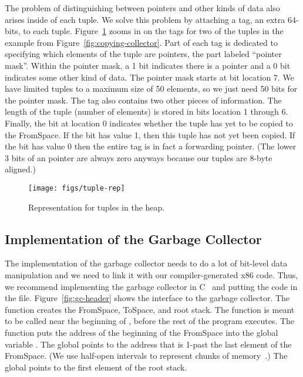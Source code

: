 \documentclass[11pt]{book}
\begin{document}
The problem of distinguishing between pointers and other kinds of data
also arises inside of each tuple. We solve this problem by attaching a
tag, an extra 64-bits, to each tuple. Figure~\ref{fig:tuple-rep} zooms
in on the tags for two of the tuples in the example from
Figure~\ref{fig:copying-collector}. Part of each tag is dedicated to
specifying which elements of the tuple are pointers, the part labeled
``pointer mask''. Within the pointer mask, a 1 bit indicates there is
a pointer and a 0 bit indicates some other kind of data. The pointer
mask starts at bit location 7. We have limited tuples to a maximum
size of 50 elements, so we just need 50 bits for the pointer mask. The
tag also contains two other pieces of information. The length of the
tuple (number of elements) is stored in bits location 1 through
6. Finally, the bit at location 0 indicates whether the tuple has yet
to be copied to the FromSpace.  If the bit has value 1, then this
tuple has not yet been copied.  If the bit has value 0 then the entire
tag is in fact a forwarding pointer. (The lower 3 bits of an pointer
are always zero anyways because our tuples are 8-byte aligned.)

\begin{figure}[tbp]
\centering \texttt{[image: figs/tuple-rep]}
\caption{Representation for tuples in the heap.}
\label{fig:tuple-rep}
\end{figure}

\subsection{Implementation of the Garbage Collector}
\label{sec:organize-gz}

The implementation of the garbage collector needs to do a lot of
bit-level data manipulation and we need to link it with our
compiler-generated x86 code. Thus, we recommend implementing the
garbage collector in C~\citep{Kernighan:1988nx} and putting the code
in the  file. Figure~\ref{fig:gc-header} shows the
interface to the garbage collector. The  function
creates the FromSpace, ToSpace, and root stack. The 
function is meant to be called near the beginning of ,
before the rest of the program executes.  The 
function puts the address of the beginning of the FromSpace into the
global variable . The global 
points to the address that is 1-past the last element of the
FromSpace. (We use half-open intervals to represent chunks of
memory~\citep{Dijkstra:1982aa}.)  The  global
points to the first element of the root stack.
\end{document}
